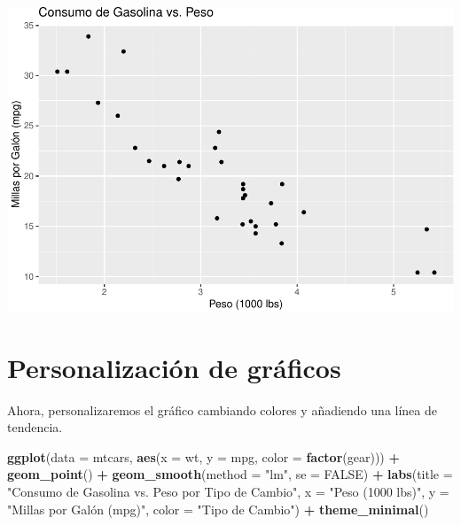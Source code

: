 \documentclass[
]{book}
\newenvironment{Shaded}{\begin{snugshade}}{\end{snugshade}}
\newcommand{\AttributeTok}[1]{\textcolor[rgb]{0.13,0.29,0.53}{#1}}
\newcommand{\ConstantTok}[1]{\textcolor[rgb]{0.56,0.35,0.01}{#1}}
\newcommand{\FunctionTok}[1]{\textcolor[rgb]{0.13,0.29,0.53}{\textbf{#1}}}
\newcommand{\NormalTok}[1]{#1}
\newcommand{\SpecialCharTok}[1]{\textcolor[rgb]{0.81,0.36,0.00}{\textbf{#1}}}
\newcommand{\StringTok}[1]{\textcolor[rgb]{0.31,0.60,0.02}{#1}}
\begin{document}
\includegraphics{bookdown-demo_files/figure-latex/unnamed-chunk-193-1.pdf}

\hypertarget{personalizaciuxf3n-de-gruxe1ficos-1}{%
\section{Personalización de gráficos}\label{personalizaciuxf3n-de-gruxe1ficos-1}}

Ahora, personalizaremos el gráfico cambiando colores y añadiendo una línea de tendencia.

\begin{Shaded}
\begin{Highlighting}[]
\FunctionTok{ggplot}\NormalTok{(}\AttributeTok{data =}\NormalTok{ mtcars, }\FunctionTok{aes}\NormalTok{(}\AttributeTok{x =}\NormalTok{ wt, }\AttributeTok{y =}\NormalTok{ mpg, }\AttributeTok{color =} \FunctionTok{factor}\NormalTok{(gear))) }\SpecialCharTok{+} 
  \FunctionTok{geom\_point}\NormalTok{() }\SpecialCharTok{+}
  \FunctionTok{geom\_smooth}\NormalTok{(}\AttributeTok{method =} \StringTok{"lm"}\NormalTok{, }\AttributeTok{se =} \ConstantTok{FALSE}\NormalTok{) }\SpecialCharTok{+}
  \FunctionTok{labs}\NormalTok{(}\AttributeTok{title =} \StringTok{"Consumo de Gasolina vs. Peso por Tipo de Cambio"}\NormalTok{,}
       \AttributeTok{x =} \StringTok{"Peso (1000 lbs)"}\NormalTok{,}
       \AttributeTok{y =} \StringTok{"Millas por Galón (mpg)"}\NormalTok{,}
       \AttributeTok{color =} \StringTok{"Tipo de Cambio"}\NormalTok{) }\SpecialCharTok{+}
  \FunctionTok{theme\_minimal}\NormalTok{()}
\end{Highlighting}
\end{Shaded}
\end{document}
